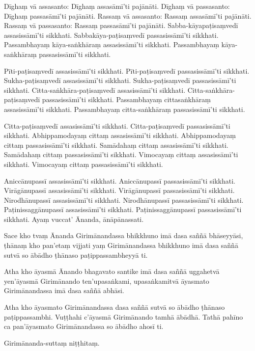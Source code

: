 Dīghaṃ vā assasanto: Dīghaṃ assasāmī’ti pajānāti. Dīghaṃ vā passasanto:
Dīghaṃ passasāmī’ti pajānāti. Rassaṃ vā assasanto: Rassaṃ assasāmī’ti
pajānāti. Rassaṃ vā passasanto: Rassaṃ passasāmī’ti pajānāti.
Sabba-kāyapaṭisaṃvedī assasissāmī’ti sikkhati. Sabbakāya-paṭisaṃvedī
passasissāmī’ti sikkhati. Passambhayaṃ kāya-saṅkhāraṃ assasissāmī’ti
sikkhati. Passambhayaṃ kāya-saṅkhāraṃ passasissāmī’ti sikkhati.

Pīti-paṭisaṃvedī assasissāmī’ti sikkhati. Pīti-paṭisaṃvedī passasissāmī’ti
sikkhati. Sukha-paṭisaṃvedī assasissāmī’ti sikkhati. Sukha-paṭisaṃvedī
passasissāmī’ti sikkhati. Citta-saṅkhāra-paṭisaṃvedī assasissāmī’ti sikkhati.
Citta-saṅkhāra-paṭisaṃvedī passasissāmī’ti sikkhati. Passambhayaṃ
cittasaṅkhāraṃ assasissāmī’ti sikkhati. Passambhayaṃ citta-saṅkhāraṃ
passasissāmī’ti sikkhati.

Citta-paṭisaṃvedī assasissāmī’ti sikkhati. Citta-paṭisaṃvedī passasissāmī’ti
sikkhati. Abhippamodayaṃ cittaṃ assasissāmī’ti sikkhati. Abhippamodayaṃ
cittaṃ passasissāmī’ti sikkhati. Samādahaṃ cittaṃ assasissāmī’ti sikkhati.
Samādahaṃ cittaṃ passasissāmī’ti sikkhati. Vimocayaṃ cittaṃ assasissāmī’ti
sikkhati. Vimocayaṃ cittaṃ passasissāmī’ti sikkhati.

Aniccānupassī assasissāmī’ti sikkhati. Aniccānupassī passasissāmī’ti
sikkhati. Virāgānupassī assasissāmī’ti sikkhati. Virāgānupassī
passasissāmī’ti sikkhati. Nirodhānupassī assasissāmī’ti sikkhati.
Nirodhānupassī passasissāmī’ti sikkhati. Paṭinissaggānupassī assasissāmī’ti
sikkhati. Paṭinissaggānupassī passasissāmī’ti sikkhati. Ayaṃ vuccat’ Ānanda,
ānāpānassati.

Sace kho tvaṃ Ānanda Girimānandassa bhikkhuno imā dasa saññā bhāseyyāsi,
ṭhānaṃ kho pan’etaṃ vijjati yaṃ Girimānandassa bhikkhuno imā dasa saññā sutvā so
ābādho ṭhānaso paṭippassambheyyā ti.

Atha kho āyasmā Ānando bhagavato santike imā dasa saññā uggahetvā yen’āyasmā
Girimānando ten’upasaṅkami, upasaṅkamitvā āyasmato Girimānandassa imā dasa saññā
abhāsi.

Atha kho āyasmato Girimānandassa dasa saññā sutvā so ābādho ṭhānaso
paṭippassambhi. Vuṭṭhahi c’āyasmā Girimānando tamhā ābādhā. Tathā pahīno ca
pan’āyasmato Girimānandassa so ābādho ahosī ti.

Girimānanda-suttaṃ niṭṭhitaṃ. 

